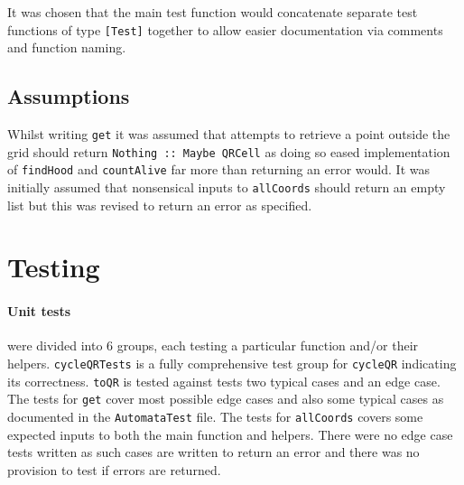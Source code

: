 \documentclass[11pt]{article}
\begin{document}
   It was chosen that the main test function would concatenate separate test functions of type \verb|[Test]| together to allow easier documentation via comments and function naming. 

 \subsection{Assumptions}%
Whilst writing \verb|get| it was assumed that attempts to retrieve a point outside the grid should return \verb|Nothing :: Maybe QRCell| as doing so eased implementation of \verb|findHood| and \verb|countAlive| far more than returning an error would. It was initially assumed that nonsensical inputs to \verb|allCoords| should return an empty list but this was revised to return an error as specified.


\section{Testing}%
\paragraph{Unit tests} were divided into 6 groups, each testing a particular function and/or their helpers. \verb|cycleQRTests| is a fully comprehensive test group for \verb|cycleQR| indicating its correctness. \verb|toQR| is tested against tests two typical cases and an edge case. The tests for \verb|get| cover most possible edge cases and also some typical cases as documented in the \verb|AutomataTest| file. The tests for \verb|allCoords| covers some expected inputs to both the main function and helpers. There were no edge case tests written as such cases are written to return an error and there was no provision to test if errors are returned.\\
\end{document}
